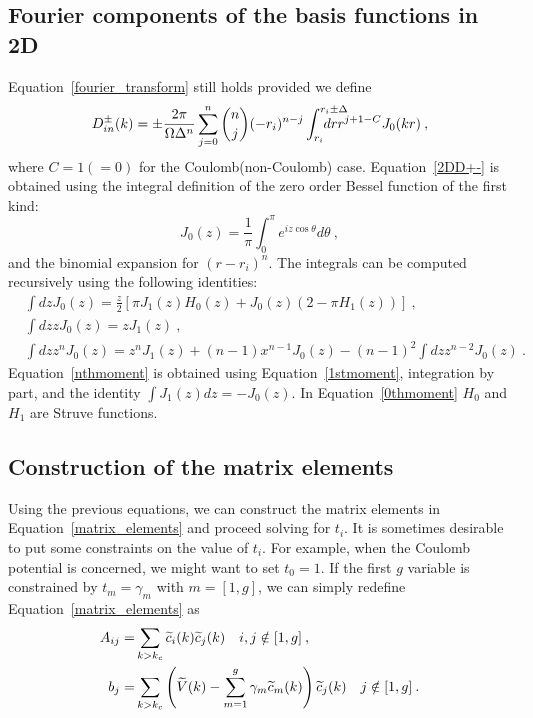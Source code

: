 \subsection{Fourier components of the basis functions in 2D}
Equation~\ref{fourier_transform} still holds provided we define  
\begin{equation}
D^\pm_{in}(k)=\pm\frac{2\pi}{\Omega \Delta^n} \sum_{j=0}^n \binom{n}{j}
(-r_i)^{n-j}\int_{r_i}^{r_i\pm \Delta}\negthickspace \negthickspace 
\negthickspace \negthickspace \negthickspace \negthickspace \negthickspace 
dr r^{j+1-C} J_0(kr)\:,
\label{2DD+-}
\end{equation}
where $C=1(=0)$ for the Coulomb(non-Coulomb) case.
Equation~\ref{2DD+-} is obtained using the integral definition of the 
zero order Bessel function of the first kind: 
\begin{equation}
J_0(z)=\frac{1}{\pi}\int_0^\pi e^{iz\cos\theta}d\theta\:,
\end{equation}
and the binomial expansion for $(r-r_i)^n$.
The integrals can be computed recursively using the following identities:
\begin{align}
&\int dz J_0(z)=\frac{z}{2}\left[\pi J_1(z)H_0(z)+J_0(z)(2-\pi H_1(z))\right]
\label{0thmoment}\:,\\
&\int dz z J_0(z)= z J_1(z)
\label{1stmoment}\:,\\
&\int dz z^n J_0(z)= z^nJ_1(z)+(n-1)x^{n-1}J_0(z)
-(n-1)^2\int dz z^{n-2} J_0(z)\:.
\label{nthmoment}
\end{align}
Equation~\ref{nthmoment} is obtained using Equation~\ref{1stmoment}, integration by part, and 
the identity $\int J_1(z) dz =-J_0(z)$. In Equation~\ref{0thmoment} $H_0$ and $H_1$ are Struve functions.

\subsection{Construction of the matrix elements}
Using the previous equations, we can construct the matrix elements in Equation~\ref{matrix_elements}
and proceed solving for $t_i$. It is sometimes desirable to put some constraints
on the value of $t_i$. For example, when the Coulomb potential is concerned, we might 
want to set $t_{0}=1$. If the first $g$ variable is constrained by $t_{m}=\gamma_m$ 
with $m=[1,g]$, we can simply redefine Equation~\ref{matrix_elements} as
\begin{equation}
\begin{split}
A_{ij}=&\sum_{k>k_c} \widetilde{c}_i(k)\widetilde{c}_j(k)  \quad i,j\notin[1,g]\:, \\
b_j=&\sum_{k>k_c} \left(\widetilde{V}(k)-\sum_{m=1}^g \gamma_m \widetilde{c}_m(k)\right)\widetilde{c}_j(k)\quad j\notin[1,g]\:.
\end{split}
\label{modified_matrix_elements}
\end{equation}




